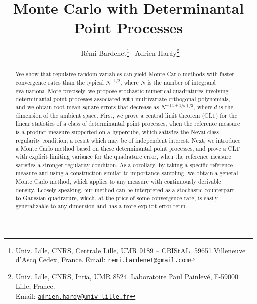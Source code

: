 \documentclass[a4paper,11pt]{article}
\title{Monte Carlo with Determinantal Point Processes}
\author{
\ R\'emi Bardenet\footnote{Univ. Lille, CNRS, Centrale Lille, UMR 9189 -- CRIStAL, 59651 Villeneuve d’Ascq Cedex, France. Email: \href{mailto:remi.bardenet@gmail.com}{\nolinkurl{remi.bardenet@gmail.com}}}
\;\qquad
\ Adrien Hardy\footnote{Univ. Lille, CNRS, Inria, UMR 8524, Laboratoire Paul Painlev\'e, F-59000 Lille, France. \\ Email: \href{mailto:adrien.hardy@univ-lille.fr}{\nolinkurl{adrien.hardy@univ-lille.fr}}}
}
\numberwithin{equation}{section}
\theoremstyle{definition}
\begin{document}
\maketitle



\begin{abstract}
We show that repulsive random variables can yield Monte Carlo
  methods with faster convergence rates than the typical  $N^{-1/2}$, where
  $N$ is the number of integrand evaluations. More precisely, we propose
  stochastic numerical quadratures involving determinantal point processes
  associated with multivariate orthogonal polynomials, and we obtain root mean square
  errors that decrease as $N^{-(1+1/d)/2}$, where $d$ is the dimension of the
  ambient space. First, we prove a central limit theorem (CLT) for the linear statistics of a class of determinantal point processes,
  when the reference measure is a product measure supported on a hypercube, which
  satisfies the Nevai-class regularity condition; a result which may be of
  independent interest. Next, we introduce a Monte Carlo method based on these
  determinantal point processes, and prove a CLT with explicit limiting variance
  for the quadrature error, when the reference measure satisfies a stronger
  regularity condition. As a corollary, by taking a specific reference measure
  and using a construction similar to importance sampling, we obtain a general
  Monte Carlo method, which applies to any measure with continuously derivable
  density. Loosely speaking, our method can be interpreted as a stochastic counterpart to
  Gaussian quadrature, which, at the price of some convergence rate, is easily
  generalizable to any dimension and has a more explicit error term.
\end{abstract}

\tableofcontents
\end{document}
